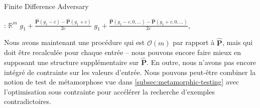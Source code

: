\begin{algorithm}[H]
\caption{Finite Difference Adversary}
\label{alg:fd_fuzz}
\begin{algorithmic}[1]
: $\mathbb{R}^m$
 
\State \Return $g_1 + \frac{\mathbf{\hat P}(g_1 - c) - \mathbf{\hat P}(g_1 + c)}{2c}$
\Else {}
\State \Return $g_1 + \frac{\mathbf{\hat P}(g_1 - c, 0, \ldots) - \mathbf{\hat P}(g_1 + c, 0, \ldots)}{2c}$, 
\EndIf
\EndProcedure
\end{algorithmic}
\end{algorithm}

Nous avons maintenant une procédure qui est $\mathcal{O}(m)$ par rapport à $\mathbf{\hat P}$, mais qui doit être recalculée pour chaque entrée -- nous pouvons encore faire mieux en supposant une structure supplémentaire sur $\mathbf{\hat P}$. En outre, nous n'avons pas encore intégré de contrainte sur les valeurs d'entrée. Nous pouvons peut-être combiner la notion de test de métamorphose vue dans \autoref{subsec:metamorphic-testing} avec l'optimisation sous contrainte pour accélérer la recherche d'exemples contradictoires.

